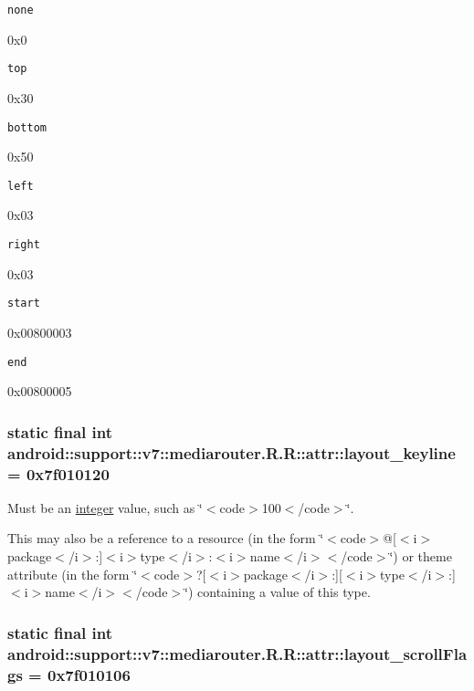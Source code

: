 {\tt none}

0x0

{\tt top}

0x30

{\tt bottom}

0x50

{\tt left}

0x03

{\tt right}

0x03

{\tt start}

0x00800003

{\tt end}

0x00800005\hypertarget{classandroid_1_1support_1_1v7_1_1mediarouter_1_1_r_1_1attr_e56f2493fea933a070c0d376edcb2a8f}{
\subsubsection[{layout\_\-keyline}]{\setlength{\rightskip}{0pt plus 5cm}static final int android::support::v7::mediarouter.R.R::attr::layout\_\-keyline = 0x7f010120}}
\label{classandroid_1_1support_1_1v7_1_1mediarouter_1_1_r_1_1attr_e56f2493fea933a070c0d376edcb2a8f}


Must be an \hyperlink{classandroid_1_1support_1_1v7_1_1mediarouter_1_1_r_1_1integer}{integer} value, such as \char`\"{}$<$code$>$100$<$/code$>$\char`\"{}. 

This may also be a reference to a resource (in the form \char`\"{}$<$code$>$@\mbox{[}$<$i$>$package$<$/i$>$:\mbox{]}$<$i$>$type$<$/i$>$:$<$i$>$name$<$/i$>$$<$/code$>$\char`\"{}) or theme attribute (in the form \char`\"{}$<$code$>$?\mbox{[}$<$i$>$package$<$/i$>$:\mbox{]}\mbox{[}$<$i$>$type$<$/i$>$:\mbox{]}$<$i$>$name$<$/i$>$$<$/code$>$\char`\"{}) containing a value of this type. \hypertarget{classandroid_1_1support_1_1v7_1_1mediarouter_1_1_r_1_1attr_47faa98761bfd1dfa0f5883ae716fff4}{
\subsubsection[{layout\_\-scrollFlags}]{\setlength{\rightskip}{0pt plus 5cm}static final int android::support::v7::mediarouter.R.R::attr::layout\_\-scrollFlags = 0x7f010106}}
\label{classandroid_1_1support_1_1v7_1_1mediarouter_1_1_r_1_1attr_47faa98761bfd1dfa0f5883ae716fff4}


